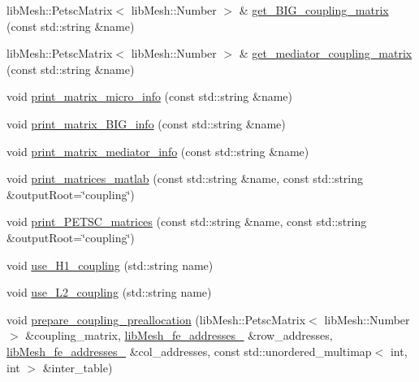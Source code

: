 \begin{DoxyCompactItemize}
\item 
lib\+Mesh\+::\+Petsc\+Matrix$<$ lib\+Mesh\+::\+Number $>$ \& \hyperlink{classcarl_1_1assemble__coupling__matrices_abfc9a6e9937e7e4ae8ec55675be18e7b}{get\+\_\+\+B\+I\+G\+\_\+coupling\+\_\+matrix} (const std\+::string \&name)
\item 
lib\+Mesh\+::\+Petsc\+Matrix$<$ lib\+Mesh\+::\+Number $>$ \& \hyperlink{classcarl_1_1assemble__coupling__matrices_af8853c49243dcd7abb0778d260cfbd6e}{get\+\_\+mediator\+\_\+coupling\+\_\+matrix} (const std\+::string \&name)
\item 
void \hyperlink{classcarl_1_1assemble__coupling__matrices_a775d91b1cca6f22f8f68e7e3b17a1f88}{print\+\_\+matrix\+\_\+micro\+\_\+info} (const std\+::string \&name)
\item 
void \hyperlink{classcarl_1_1assemble__coupling__matrices_ad96032fec0168b1e000a4e8784d65474}{print\+\_\+matrix\+\_\+\+B\+I\+G\+\_\+info} (const std\+::string \&name)
\item 
void \hyperlink{classcarl_1_1assemble__coupling__matrices_a7af032fd8eb921ad1c7bf9e4ca49ac79}{print\+\_\+matrix\+\_\+mediator\+\_\+info} (const std\+::string \&name)
\item 
void \hyperlink{classcarl_1_1assemble__coupling__matrices_ad8ae59c24fd6fe18300860f21255e9d6}{print\+\_\+matrices\+\_\+matlab} (const std\+::string \&name, const std\+::string \&output\+Root=\char`\"{}coupling\char`\"{})
\item 
void \hyperlink{classcarl_1_1assemble__coupling__matrices_a806aca42c4648a67da472798c9064585}{print\+\_\+\+P\+E\+T\+S\+C\+\_\+matrices} (const std\+::string \&name, const std\+::string \&output\+Root=\char`\"{}coupling\char`\"{})
\item 
void \hyperlink{classcarl_1_1assemble__coupling__matrices_a85dee9db3e55f42fdc51bb2408e09d1a}{use\+\_\+\+H1\+\_\+coupling} (std\+::string name)
\item 
void \hyperlink{classcarl_1_1assemble__coupling__matrices_a7640410cbb9780403d643cb8c42275f7}{use\+\_\+\+L2\+\_\+coupling} (std\+::string name)
\item 
void \hyperlink{classcarl_1_1assemble__coupling__matrices_ace985578e3743b194f9058431735d997}{prepare\+\_\+coupling\+\_\+preallocation} (lib\+Mesh\+::\+Petsc\+Matrix$<$ lib\+Mesh\+::\+Number $>$ \&coupling\+\_\+matrix, \hyperlink{classcarl_1_1lib_mesh__fe__addresses__3}{lib\+Mesh\+\_\+fe\+\_\+addresses\+\_} \&row\+\_\+addresses, \hyperlink{classcarl_1_1lib_mesh__fe__addresses__3}{lib\+Mesh\+\_\+fe\+\_\+addresses\+\_} \&col\+\_\+addresses, const std\+::unordered\+\_\+multimap$<$ int, int $>$ \&inter\+\_\+table)

\end{DoxyCompactItemize}
